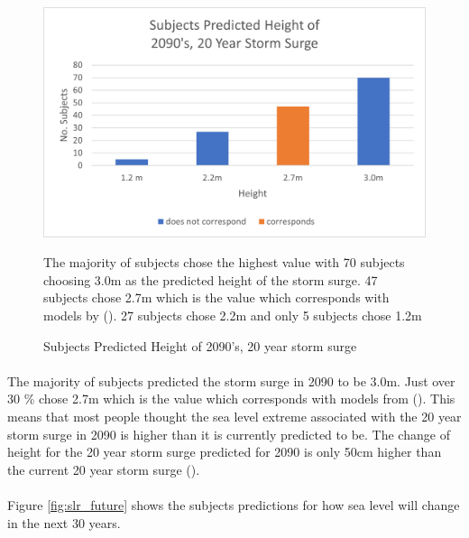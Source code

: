 \begin{figure}[H]
    \centering
    \includegraphics{fig_results/2090s 20yr ss answers.png}
    \caption{Subjects Predicted Height of 2090's, 20 year storm surge}{ The majority of subjects chose the highest value with 70 subjects choosing 3.0m as the predicted height of the storm surge. 47 subjects chose 2.7m which is the value which corresponds with models by (\cite{kartverket_se_2021}). 27 subjects chose 2.2m and only 5 subjects chose 1.2m}
    \label{fig:2090-stormsurge-answers}
\end{figure}
\paragraph{}
The majority of subjects predicted the storm surge in 2090 to be 3.0m. Just over 30 \% chose 2.7m which is the value which corresponds with models from (\cite{kartverket_se_2021}). This means that most people thought the sea level extreme associated with the 20 year storm surge in 2090 is higher than it is currently predicted to be. The change of height for the 20 year storm surge predicted for 2090 is only 50cm higher than the current 20 year storm surge (\cite{kartverket_se_2021}). 
\paragraph{}
Figure \ref{fig:slr_future} shows the subjects predictions for how sea level will change in the next 30 years. 


